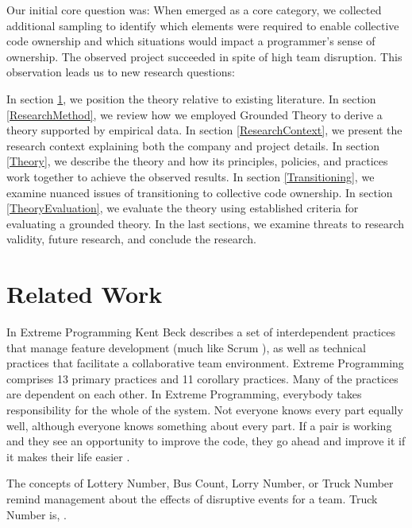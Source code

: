 Our initial core question was:  When  emerged as a core category, we collected additional sampling to identify which elements were required to enable collective code ownership and which situations would impact a programmer's sense of ownership. The observed project succeeded in spite of high team disruption. This observation leads us to new research questions: 

In section \ref{RelatedWork}, we position the theory relative to existing literature. In section \ref{ResearchMethod}, we review how we employed Grounded Theory to derive a theory supported by empirical data. In section \ref{ResearchContext}, we present the research context explaining both the company and project details. In section \ref{Theory}, we describe the theory and how its principles, policies, and practices work together to achieve the observed results. In section \ref{Transitioning}, we examine nuanced issues of transitioning to collective code ownership. In section \ref{TheoryEvaluation}, we evaluate the theory using established criteria for evaluating a grounded theory. In the last sections, we examine threats to research validity, future research, and conclude the research.


\section{Related Work}
\label{RelatedWork}
In Extreme Programming \cite{ExtremeProgramming2004} Kent Beck describes a set of interdependent practices that manage feature development (much like Scrum \cite{Scrum}), as well as technical practices that facilitate a collaborative team environment.  Extreme Programming comprises 13 primary practices and 11 corollary practices. Many of the practices are dependent on each other.  {In Extreme Programming, everybody takes responsibility for the whole of the system. Not everyone knows every part equally well, although everyone knows something about every part. If a pair is working and they see an opportunity to improve the code, they go ahead and improve it if it makes their life easier}  \cite{ExtremeProgramming2000}.



The concepts of Lottery Number, Bus Count, Lorry Number, or Truck Number remind management about the effects of disruptive events for a team. Truck Number is,  \cite{WikiTruckNumber}. 


